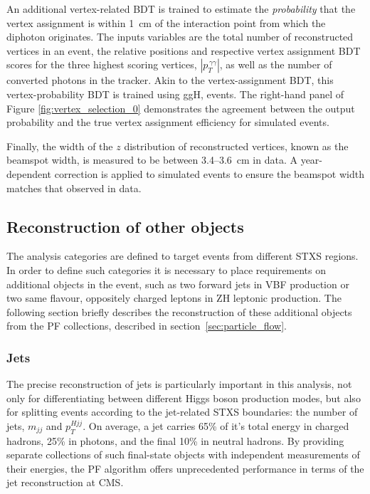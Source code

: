 An additional vertex-related BDT is trained to estimate the \textit{probability} that the vertex assignment is within 1~cm of the interaction point from which the diphoton originates. The inputs variables are the total number of reconstructed vertices in an event, the relative positions and respective vertex assignment BDT scores for the three highest scoring vertices, $|{p}_T^{\,\gamma\gamma}|$, as well as the number of converted photons in the tracker. Akin to the vertex-assignment BDT, this vertex-probability BDT is trained using ggH, \Hgg events. The right-hand panel of Figure \ref{fig:vertex_selection_0} demonstrates the agreement between the output probability and the true vertex assignment efficiency for simulated \Zmumu events.

Finally, the width of the $z$ distribution of reconstructed vertices, known as the beamspot width, is measured to be between 3.4--3.6~cm in data. A year-dependent correction is applied to simulated events to ensure the beamspot width matches that observed in data.

\subsection{Reconstruction of other objects}\label{sec:hgg_otherobjects}
The analysis categories are defined to target events from different STXS regions. In order to define such categories it is necessary to place requirements on additional objects in the event, such as two forward jets in VBF production or two same flavour, oppositely charged leptons in ZH leptonic production. The following section briefly describes the reconstruction of these additional objects from the PF collections, described in section~\ref{sec:particle_flow}.

\subsubsection{Jets}
The precise reconstruction of jets is particularly important in this analysis, not only for differentiating between different Higgs boson production modes, but also for splitting events according to the jet-related STXS boundaries: the number of jets, $m_{jj}$ and $p_T^{Hjj}$. On average, a jet carries 65\% of it's total energy in charged hadrons, 25\% in photons, and the final 10\% in neutral hadrons. By providing separate collections of such final-state objects with independent measurements of their energies, the PF algorithm offers unprecedented performance in terms of the jet reconstruction at CMS. 

